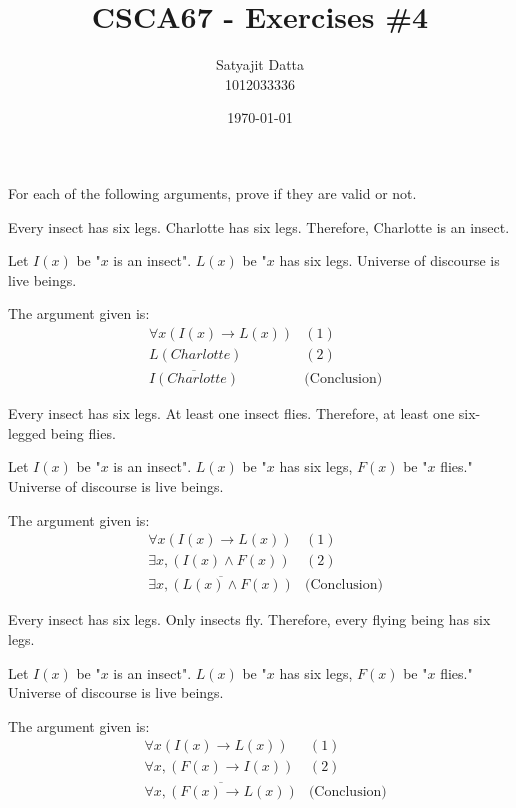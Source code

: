 \documentclass[]{article}
\title{\textbf{CSCA67 - Exercises \#4}}
\author{Satyajit Datta \\ 1012033336}
\date{\today}
\begin{document}
\maketitle

For each of the following arguments, prove if they are valid or not.


\begin{question}{1.1}
Every insect has six legs. Charlotte has six legs. Therefore, Charlotte is an insect.

Let $I(x)$ be "$x$ is an insect". $L(x)$ be "$x$ has six legs. Universe of discourse is live beings.
\end{question}

The argument given is:
\begin{align*}
    & \forall x(I(x) \rightarrow L(x)) & (1)\\
    & L(Charlotte) & (2)\\
    & \overline{I(Charlotte)} & \text{(Conclusion)}
\end{align*}


\begin{question}{1.2}
Every insect has six legs. At least one insect flies. Therefore, at least one six-legged being flies.

Let $I(x)$ be "$x$ is an insect". $L(x)$ be "$x$ has six legs, $F(x)$ be "$x$ flies." Universe of discourse is live beings.
\end{question}

The argument given is:
\begin{align*}
    & \forall x(I(x) \rightarrow L(x)) & (1)\\
    & \exists x, (I(x) \land F(x)) & (2)\\
    & \overline{\exists x, (L(x) \land F(x))} & \text{(Conclusion)}
\end{align*}

\begin{question}{1.3}
Every insect has six legs. Only insects fly. Therefore, every flying being has six legs.

Let $I(x)$ be "$x$ is an insect". $L(x)$ be "$x$ has six legs, $F(x)$ be "$x$ flies." Universe of discourse is live beings.
\end{question}

The argument given is:
\begin{align*}
    & \forall x(I(x) \rightarrow L(x)) & (1)\\
    & \forall x, (F(x) \rightarrow I(x)) & (2)\\
    & \overline{\forall x, (F(x) \rightarrow L(x))} & \text{(Conclusion)}
\end{align*}
\end{document}
